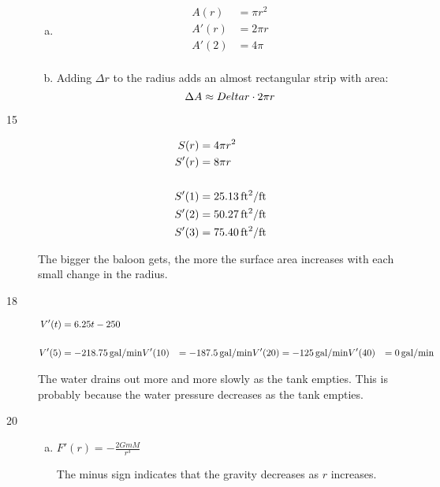 \documentclass[letterpaper, landscape]{exam}
\begin{document}
\begin{description}
\begin{enumerate}[(a)]
        \item 
          \begin{align*}
            A(r)  & = \pi r^2 \\
            A'(r) & = 2 \pi r \\
            A'(2) & = 4 \pi \\
          \end{align*}

        \item Adding $\Delta r$ to the radius adds an almost rectangular strip with area:
          \[
            \Delta A \approx Delta r \cdot 2 \pi r \\
          \]
      \end{enumerate}

    \item[15]
      \begin{align*}
        S(r) &= 4 \pi r^2 \\
        S'(r) &= 8 \pi r \\
        \\
        S'(1) &= \unit[25.13]{ft^2/ft} \\
        S'(2) &= \unit[50.27]{ft^2/ft} \\
        S'(3) &= \unit[75.40]{ft^2/ft} \\
      \end{align*}

      The bigger the baloon gets, the more the surface area increases with each
      small change in the radius.

    \item[18]
      \begin{align*}
        V'(t)  & = 6.25t - 250 \\
        \\
        V'(5)  & = \unit[-218.75]{gal/min}
        V'(10) & = \unit[-187.5]{gal/min}
        V'(20) & = \unit[-125]{gal/min}
        V'(40) & = \unit[0]{gal/min}
      \end{align*}

      The water drains out more and more slowly as the tank empties. This is probably because
      the water pressure decreases as the tank empties.

    \item[20]
      \begin{enumerate}[(a)]
        \item $F'(r) = -\frac{2 G m M}{r^3}$

          The minus sign indicates that the gravity decreases as $r$ increases.


\end{enumerate}
\end{description}
\end{document}
